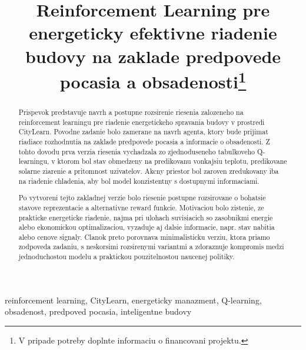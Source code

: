 \documentclass[conference]{IEEEtran}
\begin{document}
\title{Reinforcement Learning pre energeticky efektivne riadenie budovy na zaklade predpovede pocasia a obsadenosti\thanks{V pripade potreby doplnte informaciu o financovani projektu.}}

\author{
\and
{}
}

\maketitle

\begin{abstract}
Prispevok predstavuje navrh a postupne rozsirenie riesenia zalozeneho na reinforcement learningu pre riadenie energetickeho spravania budovy v prostredi CityLearn. Povodne zadanie bolo zamerane na navrh agenta, ktory bude prijimat riadiace rozhodnutia na zaklade predpovede pocasia a informacie o obsadenosti. Z tohto dovodu prva verzia riesenia vychadzala zo zjednoduseneho tabulkoveho Q-learningu, v ktorom bol stav obmedzeny na predikovanu vonkajsiu teplotu, predikovane solarne ziarenie a pritomnost uzivatelov. Akcny priestor bol zaroven zredukovany iba na riadenie chladenia, aby bol model konzistentny s dostupnymi informaciami.

Po vytvoreni tejto zakladnej verzie bolo riesenie postupne rozsirovane o bohatsie stavove reprezentacie a alternativne reward funkcie. Motivaciou bolo zistenie, ze prakticke energeticke riadenie, najma pri ulohach suvisiacich so zasobnikmi energie alebo ekonomickou optimalizaciou, vyzaduje aj dalsie informacie, napr. stav nabitia alebo cenove signaly. Clanok preto porovnava minimalisticku verziu, ktora priamo zodpoveda zadaniu, s neskorsimi rozsirenymi variantmi a zdoraznuje kompromis medzi jednoduchostou modelu a praktickou pouzitelnostou naucenej politiky.
\end{abstract}

\begin{IEEEkeywords}
reinforcement learning, CityLearn, energeticky manazment, Q-learning, obsadenost, predpoved pocasia, inteligentne budovy
\end{IEEEkeywords}
\end{document}
